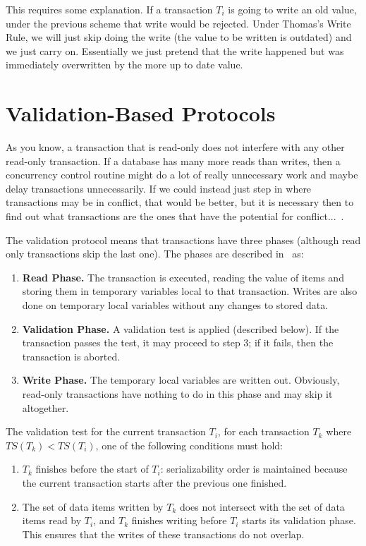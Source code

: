 \documentclass[a4paper]{report}
\begin{document}
This requires some explanation. If a transaction $T_{i}$ is going to write an old value, under the previous scheme that write would be rejected. Under Thomas's Write Rule, we will just skip doing the write (the value to be written is outdated) and we just carry on. Essentially we just pretend that the write happened but was immediately overwritten by the more up to date value. 

\section*{Validation-Based Protocols}

As you know, a transaction that is read-only does not interfere with any other read-only transaction. If a database has many more reads than writes, then a concurrency control routine might do a lot of really unnecessary work and maybe delay transactions unnecessarily. If we could instead just step in where transactions may be in conflict, that would be better, but it is necessary then to find out what transactions are the ones that have the potential for conflict...~\cite{dsc}.

The validation protocol means that transactions have three phases (although read only transactions skip the last one). The phases are described in~\cite{dsc} as:

\begin{enumerate}
	\item \textbf{Read Phase.} The transaction is executed, reading the value of items and storing them in temporary variables local to that transaction. Writes are also done on temporary local variables without any changes to stored data.
	\item \textbf{Validation Phase.} A validation test is applied (described below). If the transaction passes the test, it may proceed to step 3; if it fails, then the transaction is aborted.
	\item \textbf{Write Phase.} The temporary local variables are written out. Obviously, read-only transactions have nothing to do in this phase and may skip it altogether.
	
\end{enumerate}

The validation test for the current transaction $T_{i}$, for each transaction $T_{k}$ where $T\!S(T_{k}) < T\!S(T_{i})$, one of the following conditions must hold:

\begin{enumerate}
	\item $T_{k}$ finishes before the start of $T_{i}$: serializability order is maintained because the current transaction starts after the previous one finished.
	\item The set of data items written by $T_{k}$ does not intersect with the set of data items read by $T_{i}$, and $T_{k}$ finishes writing before $T_{i}$ starts its validation phase. This ensures that the writes of these transactions do not overlap.
\end{enumerate} 
\end{document}

